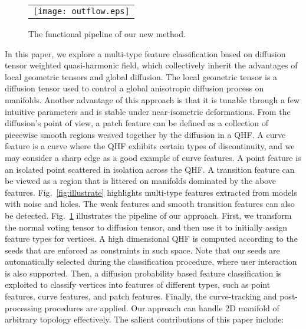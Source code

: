 \documentclass[10pt,journal,cspaper,compsoc]{IEEEtran}
\begin{document}
\begin{figure}
\begin{center}
\begin{tabular}{@{}c@{}}
\texttt{[image: outflow.eps]} \\
\end{tabular}
\caption{The functional pipeline of our new method.}
\label{fig:outflow}
\end{center}
\end{figure}

In this paper, we explore a multi-type feature classification based on
diffusion tensor weighted quasi-harmonic field, which collectively
inherit the advantages of local geometric tensors and global
diffusion. The local geometric tensor is a diffusion tensor used to
control a global anisotropic diffusion process on manifolds. Another
advantage of this approach is that it is tunable through a few
intuitive parameters and is stable under near-isometric deformations.
From the diffusion's point of view, a patch feature can be defined as
a collection of piecewise smooth regions weaved together by the
diffusion in a QHF. A curve feature is a curve where the QHF exhibits
certain types of discontinuity, and we may consider a sharp edge as a
good example of curve features. A point feature is an isolated point
scattered in isolation across the QHF. A transition feature can be
viewed as a region that is littered on manifolds dominated by the
above features. Fig.~\ref{fig:illustrate} highlights multi-type
features extracted from models with noise and holes. The weak features
and smooth transition features can also be detected.
Fig.~\ref{fig:outflow} illustrates the pipeline of our approach.
First, we transform the normal voting tensor to diffusion tensor, and
then use it to initially assign feature types for vertices. A high
dimensional QHF is computed according to the seeds that are enforced
as constraints in such space.  Note that our seeds are automatically
selected during the classification procedure, where user interaction
is also supported. Then, a diffusion probability based feature
classification is exploited to classify vertices into features of
different types, such as point features, curve features, and patch
features. Finally, the curve-tracking and post-processing procedures
are applied. Our approach can handle 2D manifold of arbitrary topology
effectively. The salient contributions of this paper include:
\end{document}
